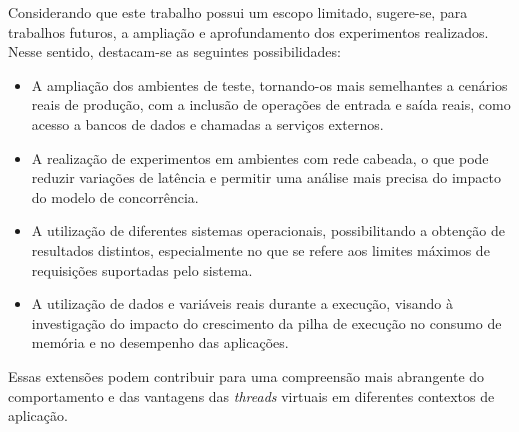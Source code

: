 \documentclass[12pt, openright, oneside, a4paper, english,	french,	spanish, brazil	]{abntex2}
\begin{document}
Considerando que este trabalho possui um escopo limitado, sugere-se, para trabalhos futuros, a ampliação e aprofundamento dos experimentos realizados. Nesse sentido, destacam-se as seguintes possibilidades:

\begin{itemize}
    \item A ampliação dos ambientes de teste, tornando-os mais semelhantes a cenários reais de produção, com a inclusão de operações de entrada e saída reais, como acesso a bancos de dados e chamadas a serviços externos.
    
    \item A realização de experimentos em ambientes com rede cabeada, o que pode reduzir variações de latência e permitir uma análise mais precisa do impacto do modelo de concorrência.
    
    \item A utilização de diferentes sistemas operacionais, possibilitando a obtenção de resultados distintos, especialmente no que se refere aos limites máximos de requisições suportadas pelo sistema.

    \item A utilização de dados e variáveis reais durante a execução, visando à investigação do impacto do crescimento da pilha de execução no consumo de memória e no desempenho das aplicações.

\end{itemize}

Essas extensões podem contribuir para uma compreensão mais abrangente do comportamento e das vantagens das \textit{threads} virtuais em diferentes contextos de aplicação.

% 


\postextual



% 
% 
\end{document}
